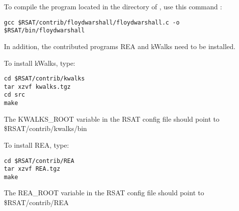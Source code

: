 \documentclass{book}
\begin{document}
To compile the program  located in the
 directory of \RSAT, use this command :

\begin{footnotesize}
\begin{verbatim}
gcc $RSAT/contrib/floydwarshall/floydwarshall.c -o $RSAT/bin/floydwarshall
\end{verbatim}
\end{footnotesize}


In addition, the contributed programs REA and kWalks need to be installed.

To install kWalks, type:

\begin{footnotesize}
\begin{verbatim}
cd $RSAT/contrib/kwalks
tar xzvf kwalks.tgz
cd src
make
\end{verbatim}
\end{footnotesize}


The KWALKS\_ROOT variable in the RSAT config file should point to
\$RSAT/contrib/kwalks/bin

To install REA, type:

\begin{footnotesize}
\begin{verbatim}
cd $RSAT/contrib/REA
tar xzvf REA.tgz
make
\end{verbatim}
\end{footnotesize}

The REA\_ROOT variable in the RSAT config file should point to
\$RSAT/contrib/REA






\end{document}
